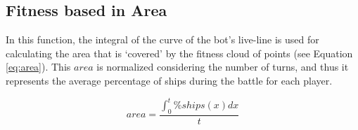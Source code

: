 \documentclass[preprint]{elsarticle}
\begin{document}


\subsection{Fitness based in Area}
\label{sec:fitness}

In this function, the integral of the curve of the bot's live-line is used for calculating the area that is `covered' by the fitness cloud of points (see Equation \ref{eq:area}). This {$area$} is normalized considering the number of turns, and thus it represents the average percentage of ships during the battle for each player. 

\begin{equation}
        area=\frac{\int_{0}^{t}\%ships(x)dx}{t}
    \label{eq:area}
\end{equation}


\end{document}
